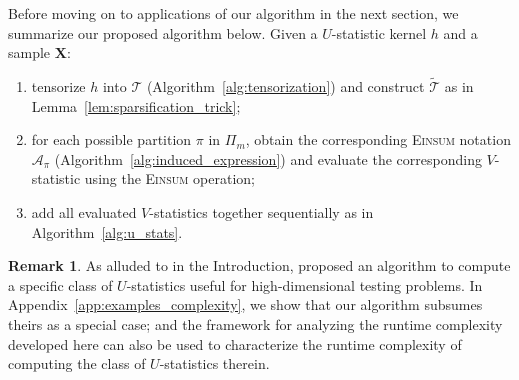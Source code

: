 \documentclass[sn-mathphys, natbib=false]{sn-jnl}
\theoremstyle{plain}
\theoremstyle{definition}
\newtheorem{remark}{Remark}
\def\tilde{\widetilde}
\def\Einsum{\textsc{Einsum}}
\newcommand{\graphset}{\mathcal{G}}
\newcommand{\graphform}[1]{G_{#1}}
\def\calA{\mathcal{A}}
\def\calT{\mathcal{T}}
\begin{document}
\begin{bibunit}[agsm]
Before moving on to applications of our algorithm in the next section, we summarize our proposed algorithm below. Given a $U$-statistic kernel $h$ and a sample $\bm{X}$:
\begin{enumerate}[label = (\arabic*)]
\item tensorize $h$ into $\calT$ (Algorithm~\ref{alg:tensorization}) and construct $\tilde{\calT}$ as in Lemma~\ref{lem:sparsification_trick};

\item for each possible partition $\pi$ in $\Pi_{m}$, obtain the corresponding \Einsum{} notation $\calA_{\pi}$ (Algorithm~\ref{alg:induced_expression}) and evaluate the corresponding $V$-statistic using the \Einsum{} operation;

\item add all evaluated $V$-statistics together sequentially as in Algorithm~\ref{alg:u_stats}.
\end{enumerate}

\begin{remark}
\label{rem:he}
As alluded to in the Introduction, \citet{he2021asymptotically} proposed an algorithm to compute a specific class of $U$-statistics useful for high-dimensional testing problems. In Appendix~\ref{app:examples_complexity}, we show that our algorithm subsumes theirs as a special case; and the framework for analyzing the runtime complexity developed here can also be used to characterize the runtime complexity of computing the class of $U$-statistics therein.
\end{remark}




\end{bibunit}
\end{document}
